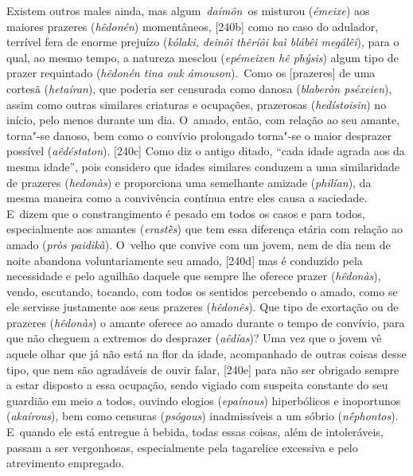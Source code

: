 Existem outros males ainda, mas algum~\emph{daímôn}~os misturou
(\emph{émeixe}) aos maiores prazeres (\emph{hêdonén}) momentâneos,
[240b] como no caso do adulador, terrível fera de enorme prejuízo
(\emph{kólaki, deinôi thêríôi kaì blábêi megálêi}), para o qual, ao
mesmo tempo, a natureza mesclou (\emph{epémeixen hê phýsis}) algum tipo
de prazer requintado (\emph{hêdonén tina ouk ámouson}).~Como os
[prazeres] de uma cortesã (\emph{hetaíran}), que poderia ser
censurada como danosa (\emph{blaberòn pséxeien}), assim como outras
similares criaturas e ocupações, prazerosas (\emph{hedístoisin}) no
início, pelo menos durante um dia. O~amado, então, com relação ao seu
amante, torna"-se danoso, bem como o convívio prolongado torna"-se o maior
desprazer possível (\emph{aêdéstaton}). [240c] Como diz o antigo
ditado, ``cada idade agrada aos da mesma idade'', pois considero que
idades similares conduzem a uma similaridade de prazeres
(\emph{hedonàs}) e proporciona uma semelhante amizade (\emph{philían}),
da mesma maneira como a convivência contínua entre eles causa a
saciedade. E~dizem que o constrangimento é pesado em todos os casos e
para todos, especialmente aos amantes (\emph{erastḕs}) que tem essa
diferença etária com relação ao amado (\emph{pròs paidikà}). O~velho que
convive com um jovem, nem de dia nem de noite abandona voluntariamente
seu amado, [240d] mas é conduzido pela necessidade e pelo aguilhão
daquele que sempre lhe oferece prazer (\emph{hêdonàs}), vendo,
escutando, tocando, com todos os sentidos percebendo o amado, como se
ele servisse justamente aos seus prazeres (\emph{hêdonês}). Que tipo de
exortação ou de prazeres (\emph{hêdonàs}) o amante oferece ao amado
durante o tempo de convívio, para que não cheguem a extremos do
desprazer (\emph{aêdías})? Uma vez que o jovem vê aquele olhar que já
não está na flor da idade, acompanhado de outras coisas desse tipo, que
nem são agradáveis de ouvir falar, [240e] para não ser obrigado
sempre a estar disposto a essa ocupação, sendo vigiado com suspeita
constante do seu guardião em meio a todos, ouvindo elogios
(\emph{epaínous}) hiperbólicos e inoportunos (\emph{akaírous}), bem como
censuras (\emph{psógous}) inadmissíveis a um sóbrio (\emph{nḗphontos}).
E~quando ele está entregue à bebida, todas essas coisas, além de
intoleráveis, passam a ser vergonhosas, especialmente pela tagarelice
excessiva e pelo atrevimento empregado.

